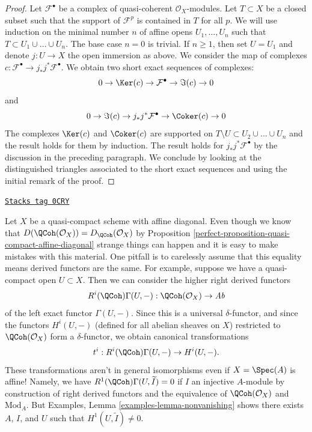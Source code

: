 \begin{proof}
\medskip\noindent
Let $\mathcal{F}^\bullet$ be a complex of quasi-coherent
$\mathcal{O}_X$-modules. Let $T \subset X$ be a closed subset
such that the support of $\mathcal{F}^p$ is contained in $T$
for all $p$. We will use induction on the minimal number $n$
of affine opens $U_1, \ldots, U_n$ such that
$T \subset U_1 \cup \ldots \cup U_n$. The base case $n = 0$ is trivial.
If $n \geq 1$, then set $U = U_1$ and denote $j : U \to X$ the
open immersion as above. We consider the map of complexes
$c : \mathcal{F}^\bullet \to j_*j^*\mathcal{F}^\bullet$.
We obtain two short exact sequences of complexes:
$$
0 \to \Ker(c) \to \mathcal{F}^\bullet \to \Im(c) \to 0
$$
and
$$
0 \to \Im(c) \to j_*j^*\mathcal{F}^\bullet \to \Coker(c) \to 0
$$
The complexes $\Ker(c)$ and $\Coker(c)$ are supported
on $T \setminus U \subset U_2 \cup \ldots \cup U_n$ and the result
holds for them by induction. The result holds for
$j_*j^*\mathcal{F}^\bullet$ by the discussion in the preceding
paragraph. We conclude by looking at the distinguished triangles
associated to the short exact sequences and using the initial
remark of the proof.
\end{proof}

\begin{remark}[Warning]

\label{perfect-remark-warning-coherator}
\href{https://stacks.math.columbia.edu/tag/0CRY}{\texttt{Stacks tag 0CRY}}

Let $X$ be a quasi-compact scheme with affine diagonal. Even though we know
that $D(\QCoh(\mathcal{O}_X)) = D_\QCoh(\mathcal{O}_X)$ by
Proposition \ref{perfect-proposition-quasi-compact-affine-diagonal}
strange things can
happen and it is easy to make mistakes with this material. One pitfall
is to carelessly assume that this equality means derived functors are the same.
For example, suppose we have a quasi-compact open $U \subset X$. Then we can
consider the higher right derived functors
$$
R^i(\QCoh)\Gamma(U, -) : \QCoh(\mathcal{O}_X) \to \textit{Ab}
$$
of the left exact functor $\Gamma(U, -)$. Since this is a universal
$\delta$-functor, and since the functors $H^i(U, -)$ (defined for all
abelian sheaves on $X$) restricted to $\QCoh(\mathcal{O}_X)$ form
a $\delta$-functor, we obtain canonical transformations
$$
t^i : R^i(\QCoh)\Gamma(U, -) \to H^i(U, -).
$$
These transformations aren't in general isomorphisms even if $X = \Spec(A)$
is affine! Namely, we have $R^1(\QCoh)\Gamma(U, \widetilde{I}) = 0$
if $I$ an injective $A$-module by construction of right derived functors
and the equivalence of $\QCoh(\mathcal{O}_X)$ and $\text{Mod}_A$.
But Examples, Lemma \ref{examples-lemma-nonvanishing}
shows there exists $A$, $I$, and $U$ such that
$H^1(U, \widetilde{I}) \not = 0$.
\end{remark}

